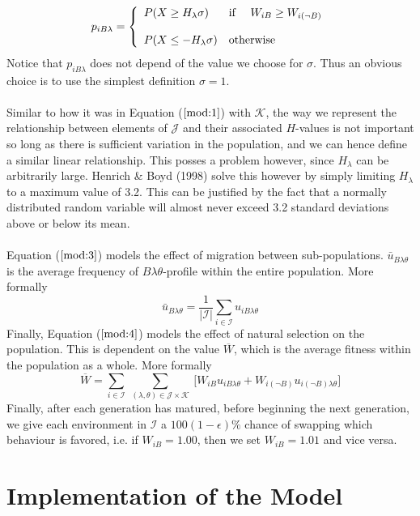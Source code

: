 \documentclass[a4paper,8pt]{extarticle}
\begin{document}
\[
    p_{iB\lambda}=\left\{\begin{array}{ll}
         P(X\ge H_\lambda\sigma)& \text{if \quad $W_{iB}\ge W_{i(\lnot B)}$} \\\\
         P(X\le-H_\lambda\sigma)& \text{otherwise}
    \end{array}\right.
\]
Notice that $p_{iB\lambda}$ does not depend of the value we choose for $\sigma$. Thus an obvious choice is to use the simplest definition $\sigma=1$.
\\\\
Similar to how it was in Equation ($\ref{mod:1}$) with $\mathcal K$, the way we represent the relationship between elements of $\mathcal J$ and their associated $H$-values is not important so long as there is sufficient variation in the population, and we can hence define a similar linear relationship. This posses a problem however, since $H_\lambda$ can be arbitrarily large. Henrich \& Boyd (1998) solve this however by simply limiting $H_\lambda$ to a maximum value of 3.2. This can be justified by the fact that a normally distributed random variable will almost never exceed 3.2 standard deviations above or below its mean.
\\\\
Equation ($\ref{mod:3}$) models the effect of migration between sub-populations. $\bar u_{B\lambda\theta}$ is the average frequency of $B\lambda\theta$-profile within the entire population. More formally
\[
    \bar u_{B\lambda\theta}=\frac 1 {|\mathcal I|}\sum_{i\in \mathcal I} u_{iB\lambda\theta}
\]
Finally, Equation ($\ref{mod:4}$) models the effect of natural selection on the population. This is dependent on the value $\overline W$, which is the average fitness within the population as a whole. More formally
\[
    \overline W =
    \sum_{i\in \mathcal I}\ 
    \sum_{(\lambda,\theta)\in\mathcal J\times\mathcal K}\ 
    \Big[
        W_{iB}u_{iB\lambda\theta}
        +
        W_{i(\lnot B)}u_{i(\lnot B)\lambda\theta}
    \Big]
\]
Finally, after each generation has matured, before beginning the next generation, we give each environment in $\mathcal I$ a $100(1-\epsilon) \%$ chance of swapping which behaviour is favored, i.e. if $W_{iB}=1.00$, then we set $W_{iB}=1.01$ and vice versa.


\section{Implementation of the Model}
\end{document}
